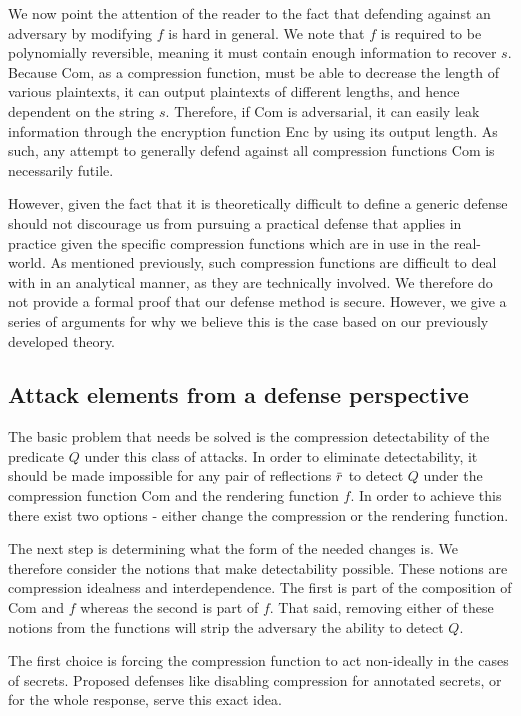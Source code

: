 \documentclass[conference, letterpaper, 10pt]{IEEEtran}
\newcommand{\overbar}[1]{\mkern 1.5mu\overline{\mkern-1.5mu#1\mkern-1.5mu}\mkern 1.5mu}
\begin{document}
We now point the attention of the reader to the fact that defending against an
adversary by modifying $f$ is hard in general. We note that $f$ is required to
be polynomially reversible, meaning it must contain enough information to
recover $s$. Because Com, as a compression function, must be able to decrease
the length of various plaintexts, it can output plaintexts of different
lengths, and hence dependent on the string $s$. Therefore, if Com is
adversarial, it can easily leak information through the encryption function Enc
by using its output length. As such, any attempt to generally defend against
all compression functions Com is necessarily futile.

However, given the fact that it is theoretically difficult to define a generic
defense should not discourage us from pursuing a practical defense that applies
in practice given the specific compression functions which are in use in the
real-world. As mentioned previously, such compression functions are difficult
to deal with in an analytical manner, as they are technically involved. We
therefore do not provide a formal proof that our defense method is secure.
However, we give a series of arguments for why we believe this is the case
based on our previously developed theory.

\subsection{Attack elements from a defense perspective}
The basic problem that needs be solved is the compression detectability of
the predicate $Q$ under this class of attacks. In order to eliminate detectability,
it should be made impossible for any pair of reflections $\overbar{r}$ to detect
$Q$ under the compression function $\textrm{Com}$ and the rendering function $f$. In order to
achieve this there exist two options - either change the compression or the
rendering function.

The next step is determining what the form of the needed changes is. We
therefore consider the notions that make detectability possible.
These notions are compression idealness and interdependence. The first is part
of the composition of $\textrm{Com}$ and $f$ whereas the second is part of $f$. That
said, removing either of these notions from the functions will strip the
adversary the ability to detect $Q$.

The first choice is forcing the compression function to act non-ideally in the
cases of secrets. Proposed defenses like disabling compression for annotated
secrets, or for the whole response, serve this exact idea.
\end{document}
